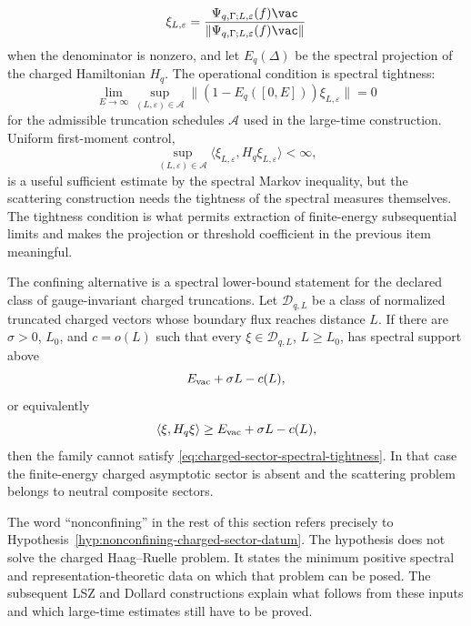 \begin{hypothesis}
\begin{enumerate}
\[
  \xi_{L,\varepsilon}
  =
  \frac{\Psi_{q,\Gamma;L,\varepsilon}(f)\vac}
       {\|\Psi_{q,\Gamma;L,\varepsilon}(f)\vac\|}
\]
when the denominator is nonzero, and let \(E_q(\Delta)\) be the spectral
projection of the charged Hamiltonian \(H_q\).  The operational condition is
spectral tightness:
\begin{equation}
  \lim_{E\to\infty}
  \sup_{(L,\varepsilon)\in\mathcal A}
  \bigl\|(1-E_q([0,E]))\xi_{L,\varepsilon}\bigr\|=0
  \label{eq:charged-sector-spectral-tightness}
\end{equation}
for the admissible truncation schedules \(\mathcal A\) used in the large-time
construction.  Uniform first-moment control,
\[
  \sup_{(L,\varepsilon)\in\mathcal A}
  \langle \xi_{L,\varepsilon},H_q\xi_{L,\varepsilon}\rangle<\infty ,
\]
is a useful sufficient estimate by the spectral Markov inequality, but the
scattering construction needs the tightness of the spectral measures
themselves.  The tightness condition is what permits extraction of finite-energy
subsequential limits and makes the projection or threshold coefficient in the
previous item meaningful.

The confining alternative is a spectral lower-bound statement for the declared
class of gauge-invariant charged truncations.  Let \(\mathcal D_{q,L}\) be a
class of normalized truncated charged vectors whose boundary flux reaches
distance \(L\).  If
there are \(\sigma>0\), \(L_0\), and \(c=o(L)\) such that every
\(\xi\in\mathcal D_{q,L}\), \(L\ge L_0\), has spectral support above
\begin{equation}
  E_{\rm vac}+\sigma L-c(L),
  \label{eq:charged-sector-string-energy-lower-bound}
\end{equation}
or equivalently
\[
  \langle \xi,H_q\xi\rangle
  \ge E_{\rm vac}+\sigma L-c(L),
\]
then the family cannot satisfy
\eqref{eq:charged-sector-spectral-tightness}.  In that case the
finite-energy charged asymptotic sector is absent and the scattering problem
belongs to neutral composite sectors.
\end{enumerate}
\end{hypothesis}

The word ``nonconfining'' in the rest of this section refers precisely to
Hypothesis~\ref{hyp:nonconfining-charged-sector-datum}.  The hypothesis does
not solve the charged Haag--Ruelle problem.  It states the minimum positive
spectral and representation-theoretic data on which that problem can be
posed.  The subsequent LSZ and Dollard constructions explain what follows
from these inputs and which large-time estimates still have to be proved.

